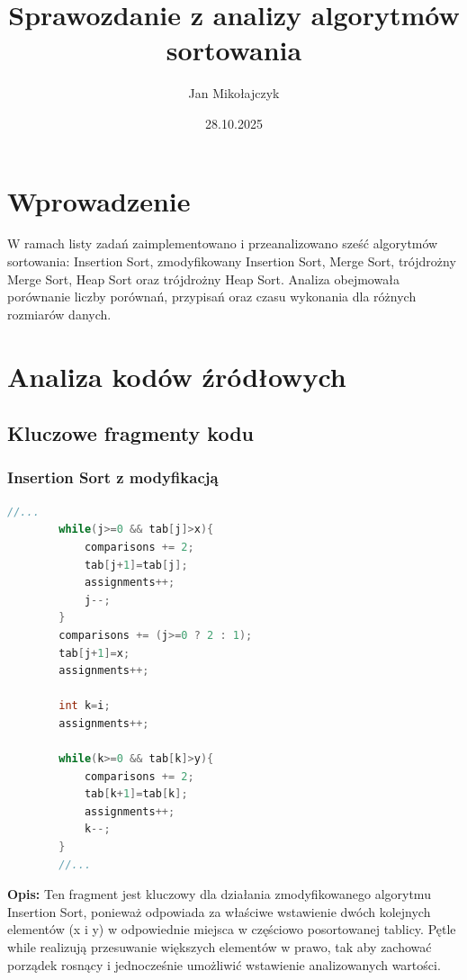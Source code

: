 \documentclass[12pt,a4paper]{article}
\title{Sprawozdanie z analizy algorytmów sortowania}
\author{Jan Mikołajczyk}
\date{28.10.2025}
\begin{document}
\maketitle

\section{Wprowadzenie}
W ramach listy zadań zaimplementowano i przeanalizowano sześć algorytmów sortowania: Insertion Sort, zmodyfikowany Insertion Sort, Merge Sort, trójdrożny Merge Sort, Heap Sort oraz trójdrożny Heap Sort. Analiza obejmowała porównanie liczby porównań, przypisań oraz czasu wykonania dla różnych rozmiarów danych.

\section{Analiza kodów źródłowych}

\subsection{Kluczowe fragmenty kodu}

\subsubsection{Insertion Sort z modyfikacją}
\begin{lstlisting}[language=C++,caption=Modyfikacja Insertion Sort]
        //...
        while(j>=0 && tab[j]>x){
            comparisons += 2;
            tab[j+1]=tab[j];
            assignments++;
            j--;
        }
        comparisons += (j>=0 ? 2 : 1);
        tab[j+1]=x;
        assignments++;

        int k=i;
        assignments++;

        while(k>=0 && tab[k]>y){
            comparisons += 2;
            tab[k+1]=tab[k];
            assignments++;
            k--;
        }
        //...
\end{lstlisting}
\textbf{Opis:} Ten fragment jest kluczowy dla działania zmodyfikowanego algorytmu Insertion Sort, ponieważ odpowiada za właściwe wstawienie dwóch kolejnych elementów (x i y) w odpowiednie miejsca w częściowo posortowanej tablicy. Pętle while realizują przesuwanie większych elementów w prawo, tak aby zachować porządek rosnący i jednocześnie umożliwić wstawienie analizowanych wartości.
\end{document}
